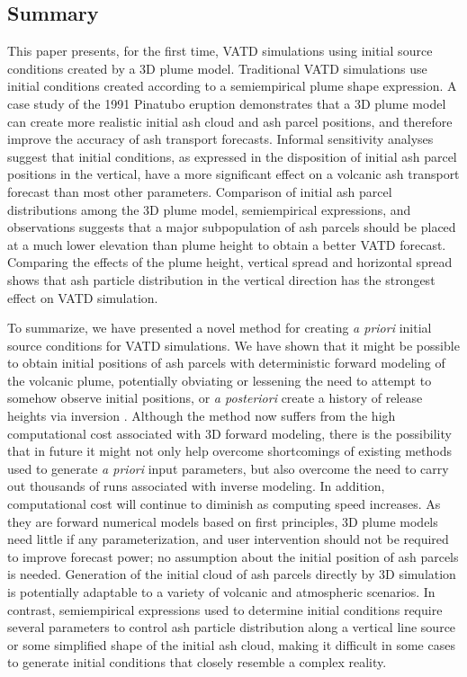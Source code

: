 \documentclass[utf8]{frontiersSCNS} %
\begin{document}
\subsection{Summary}
This paper presents, for the first time, VATD simulations using initial source conditions created by a 3D plume model. Traditional VATD simulations use initial conditions created according to a semiempirical plume shape expression. A case study of the 1991 Pinatubo eruption demonstrates that a 3D plume model can create more realistic initial ash cloud and ash parcel positions, and therefore improve the accuracy of ash transport forecasts. Informal sensitivity analyses suggest that initial conditions, as expressed in the disposition of initial ash parcel positions in the vertical, have a more significant effect on a volcanic ash transport forecast than most other parameters. Comparison of initial ash parcel distributions among the 3D plume model, semiempirical expressions, and observations suggests that a major subpopulation of ash parcels should be placed at a much lower elevation than plume height to obtain a better VATD forecast. Comparing the effects of the plume height, vertical spread and horizontal spread shows that ash particle distribution in the vertical direction has the strongest effect on VATD simulation.

To summarize, we have presented a novel method for creating \textit{a priori} initial source conditions for VATD simulations. We have shown that it might be possible to obtain initial positions of ash parcels with deterministic forward modeling of the volcanic plume, potentially obviating or lessening the need to attempt to somehow observe initial positions, or \textit{a posteriori} create a history of release heights via inversion \citep{stohl2011determination}. Although the method now suffers from the high computational cost associated with 3D forward modeling, there is the possibility that in future it might not only help overcome shortcomings of existing methods used to generate \textit{a priori} input parameters, but also overcome the need to carry out thousands of runs associated with inverse modeling. In addition, computational cost will continue to diminish as computing speed increases. As they are forward numerical models based on first principles, 3D plume models need little if any parameterization, and user intervention should not be required to improve forecast power; no assumption about the initial position of ash parcels is needed. Generation of the initial cloud of ash parcels directly by 3D simulation is potentially adaptable to a variety of volcanic and atmospheric scenarios. In contrast, semiempirical expressions used to determine initial conditions require several parameters to control ash particle distribution along a vertical line source or some simplified shape of the initial ash cloud, making it difficult in some cases to generate initial conditions that closely resemble a complex reality. 
\end{document}

